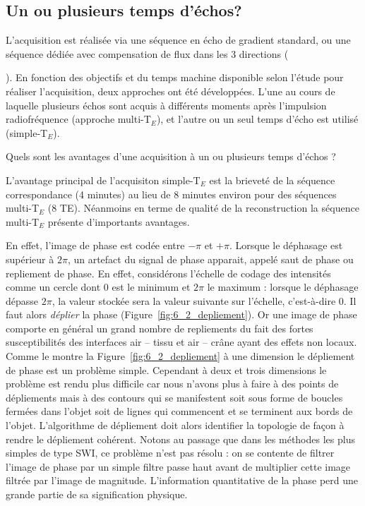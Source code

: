 \subsection{Un ou plusieurs temps d'échos?}
L’acquisition est réalisée via une séquence en écho de gradient standard, ou une séquence
dédiée avec compensation de flux dans les 3 directions ({\cite{Deistung2009}). En fonction des objectifs et du temps
machine disponible selon l’étude pour réaliser l’acquisition, deux approches ont été développées.
L’une au cours de laquelle plusieurs échos sont acquis à différents moments après l’impulsion
radiofréquence (approche multi-T$_E$), et l’autre ou un seul temps d’écho est utilisé (simple-T$_E$).

Quels sont les avantages d’une acquisition à un ou plusieurs temps d’échos ?

L’avantage principal de l’acquisiton simple-T$_E$ est la brieveté de la séquence correspondance (4
minutes) au lieu de 8 minutes environ pour des séquences multi-T$_E$ (8 TE). Néanmoins en terme de
qualité de la reconstruction la séquence multi-T$_E$ présente d’importants avantages.

En effet, l’image de phase est codée entre $-\pi$ et $+\pi$. Lorsque le déphasage est supérieur à $2\pi$,
un artefact du signal de phase apparait, appelé saut de phase ou repliement de phase. En effet,
considérons l’échelle de codage des intensités comme un cercle dont $0$ est le minimum et $2\pi$ le
maximum : lorsque le déphasage dépasse $2\pi$, la valeur stockée sera la valeur suivante sur l’échelle,
c’est-à-dire $0$. Il faut alors {\em déplier} la phase (Figure~\ref{fig:6_2_depliement}). Or une image de phase comporte en général un grand nombre de repliements du fait des fortes susceptibilités des interfaces air – tissu et air – crâne
ayant des effets non locaux. Comme le montre la Figure~\ref{fig:6_2_depliement} à une dimension le dépliement de phase
est un problème simple. Cependant à deux et trois dimensions le problème est rendu plus difficile car
nous n’avons plus à faire à des points de dépliements mais à des contours qui se manifestent soit sous
forme de boucles fermées dans l’objet soit de lignes qui commencent et se terminent aux bords de
l’objet. L’algorithme de dépliement doit alors identifier la topologie de façon à rendre le dépliement
cohérent. Notons au passage que dans les méthodes les plus simples de type SWI, ce problème n’est
pas résolu : on se contente de filtrer l’image de phase par un simple filtre passe haut avant de multiplier
cette image filtrée par l’image de magnitude. L’information quantitative de la phase perd une grande
partie de sa signification physique.

}
